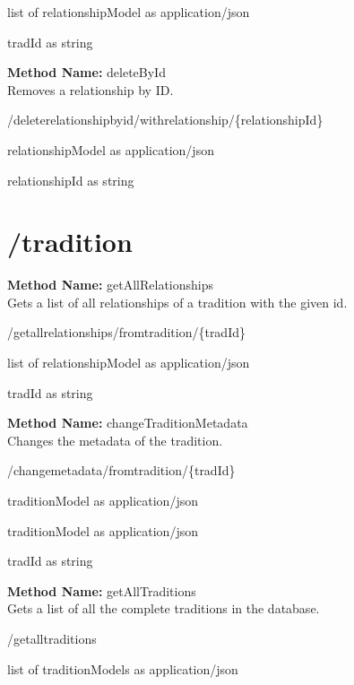 \begin{response}
list of relationshipModel as application/json
\end{response}
\begin{parameter}
tradId as string
\end{parameter}
\textbf{Method Name: }deleteById \\ Removes a relationship by ID.
\begin{delete}
/deleterelationshipbyid/withrelationship/\{relationshipId\}
\end{delete}
\begin{response}
relationshipModel as application/json
\end{response}
\begin{parameter}
relationshipId as string
\end{parameter}
\section{/tradition}
\textbf{Method Name: }getAllRelationships \\ Gets a list of all relationships of a tradition with the given id.
\begin{get}
/getallrelationships/fromtradition/\{tradId\}
\end{get}
\begin{response}
list of relationshipModel as application/json
\end{response}
\begin{parameter}
tradId as string
\end{parameter}
\textbf{Method Name: }changeTraditionMetadata \\ Changes the metadata of the tradition.
\begin{post}
/changemetadata/fromtradition/\{tradId\}
\end{post}
\begin{request}
traditionModel as application/json
\end{request}
\begin{response}
traditionModel as application/json
\end{response}
\begin{parameter}
tradId as string
\end{parameter}
\textbf{Method Name: }getAllTraditions \\ Gets a list of all the complete traditions in the database.
\begin{get}
/getalltraditions
\end{get}
\begin{response}
list of traditionModels as application/json
\end{response}
